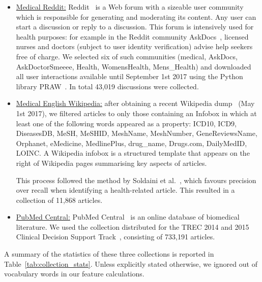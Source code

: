 \begin{itemize}[leftmargin=*]
    \item \underline{Medical Reddit:} Reddit~\cite{reddit} is a Web forum with a sizeable user community which is responsible for generating and moderating its content. Any user can start a discussion or reply to a discussion. This forum is intensively used for health purposes: for example in the Reddit community AskDocs~\cite{redditaskdocs}, licensed nurses and doctors (subject to user identity verification) advise help seekers free of charge. We selected six of such communities
        (medical, AskDocs, AskDoctorSmeeee, Health, WomensHealth, Mens\_Health) and downloaded all user interactions available until September 1st 2017 using the Python library PRAW~\cite{redditapi}. In total 43,019 discussions were collected.

\item \underline{Medical English Wikipedia:} after obtaining a recent Wikipedia dump~\cite{wikipedia} (May 1st 2017), we filtered articles to only those containing an Infobox in which at least one of the following words appeared as a property: ICD10, ICD9, DiseasesDB, MeSH, MeSHID, MeshName, MeshNumber, GeneReviewsName, Orphanet, eMedicine, MedlinePlus, drug\_name, Drugs.com, DailyMedID, LOINC. A Wikipedia infobox is a structured template that appears on the right of Wikipedia pages summarising key aspects of articles.

This process followed the method by Soldaini et al.~\cite{soldaini15}, which favours precision over recall when identifying a health-related article. This resulted in a collection of 11,868 articles. 

\item \underline{PubMed Central:} PubMed Central~\cite{pubmed} is an online  database of biomedical literature. We used the collection distributed for the TREC 2014 and 2015 Clinical Decision Support Track~\cite{roberts16,trec15}, consisting of 733,191 articles. 
 
\end{itemize}

A summary of the statistics of these three collections is reported in Table~\ref{tab:collection_stats}. 
Unless explicitly stated otherwise, we ignored out of vocabulary words in our feature calculations.

